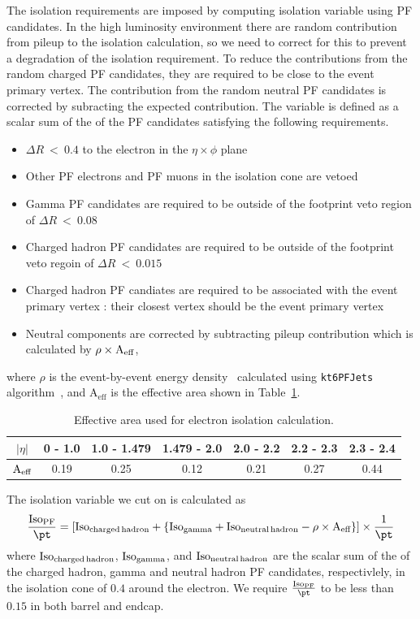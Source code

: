 The isolation requirements are imposed by computing isolation variable using 
PF candidates. 
In the high luminosity environment there are random contribution from pileup 
to the isolation calculation, so we need to correct for this to prevent 
a degradation of the isolation requirement. 
To reduce the contributions from the random charged PF candidates, they are 
required to be close to the event primary vertex. The contribution from 
the random neutral PF candidates is corrected by subracting the expected contribution. 
The variable is defined as a scalar sum of the \pt{} of the 
PF candidates satisfying the following requirements. 
\begin{itemize}
\item $\Delta R~<~0.4$ to the electron in the $\eta \times \phi$ plane
\item Other PF electrons and PF muons in the isolation cone are vetoed
\item Gamma PF candidates are required to be outside of the footprint 
      veto region of $\Delta R~<~0.08$ 
\item Charged hadron PF candidates are required to be outside of the footprint 
      veto regoin of $\Delta R~<~0.015$ 
\item Charged hadron PF candiates are required to be associated 
      with the event primary vertex : their closest vertex should be the 
      event primary vertex
\item Neutral components are corrected by subtracting pileup contribution which is 
      calculated by $\rho \times \textrm{A}_{\rm{eff}}$,
\end{itemize}
where $\rho$ is the event-by-event energy density~\cite{} calculated using 
\texttt{kt6PFJets} algorithm~\cite{}, 
and $\textrm{A}_{\textrm{eff}}$ is the effective area shown in Table~\ref{tab:electron_Aeff}. 
\begin{table}[!ht]
  \centering 
  \begin{tabular} {c||c|c|c|c|c|c}
  \hline
    $|\eta|$    & 0 - 1.0 & 1.0 - 1.479 & 1.479 - 2.0 & 2.0 - 2.2 & 2.2 - 2.3 & 2.3 - 2.4  \\
  \hline \hline
    $\textrm{A}_{\rm{eff}}$  & 0.19 & 0.25 & 0.12 & 0.21 & 0.27 & 0.44 \\ 
  \hline 
  \end{tabular}
  \caption{Effective area used for electron isolation calculation.}
  \label{tab:electron_Aeff}
\end{table}

The isolation variable we cut on is calculated as 
\begin{equation}
\frac{\rm{Iso}_{PF}}{\pt}
=
\left[ \rm{Iso}_{charged \, hadron} + \left\{ \rm{Iso}_{gamma} 
       + \rm{Iso}_{neutral \, hadron} -\rho \times \textrm{A}_{\textrm{eff}} \right\} \right]
\times \frac{1}{\pt}
\end{equation}
where $\rm{Iso}_{charged \, hadron}$, $\rm{Iso}_{gamma}$, and $\rm{Iso}_{neutral \, hadron}$ 
are the scalar sum of the \pt{} of the charged hadron, gamma and neutral hadron PF candidates, 
respectivlely, in the isolation cone of $0.4$ around the electron.
We require $\frac{\rm{Iso}_{PF}}{\pt}$ to be less than $0.15$ in both barrel and endcap.  

